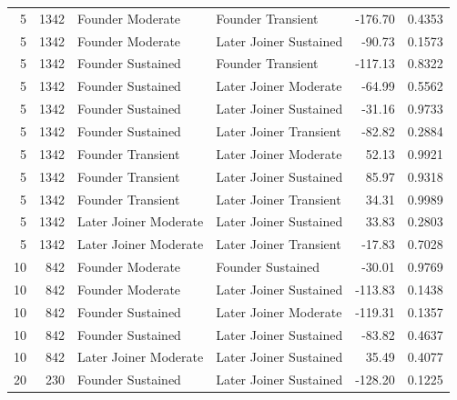\begin{table}[H]
\begin{tabular}{r r l l r r}
5 & 1342 & Founder Moderate & Founder Transient & -176.70 & 0.4353 \\ 
5 & 1342 & Founder Moderate & Later Joiner Sustained & -90.73 & 0.1573 \\ 
5 & 1342 & Founder Sustained & Founder Transient & -117.13 & 0.8322 \\ 
5 & 1342 & Founder Sustained & Later Joiner Moderate & -64.99 & 0.5562 \\ 
5 & 1342 & Founder Sustained & Later Joiner Sustained & -31.16 & 0.9733 \\ 
5 & 1342 & Founder Sustained & Later Joiner Transient & -82.82 & 0.2884 \\ 
5 & 1342 & Founder Transient & Later Joiner Moderate & 52.13 & 0.9921 \\ 
5 & 1342 & Founder Transient & Later Joiner Sustained & 85.97 & 0.9318 \\ 
5 & 1342 & Founder Transient & Later Joiner Transient & 34.31 & 0.9989 \\ 
5 & 1342 & Later Joiner Moderate & Later Joiner Sustained & 33.83 & 0.2803 \\ 
5 & 1342 & Later Joiner Moderate & Later Joiner Transient & -17.83 & 0.7028 \\ 
10 & 842 & Founder Moderate & Founder Sustained & -30.01 & 0.9769 \\ 
10 & 842 & Founder Moderate & Later Joiner Sustained & -113.83 & 0.1438 \\ 
10 & 842 & Founder Sustained & Later Joiner Moderate & -119.31 & 0.1357 \\ 
10 & 842 & Founder Sustained & Later Joiner Sustained & -83.82 & 0.4637 \\ 
10 & 842 & Later Joiner Moderate & Later Joiner Sustained & 35.49 & 0.4077 \\ 
20 & 230 & Founder Sustained & Later Joiner Sustained & -128.20 & 0.1225 \\ 
\bottomrule
\end{tabular}%
\label{tab:codebase_graph_latex_repository_graph_component_time_series_tukey_hsdnon_sigmethods} 
\end{table}
\newpage 
